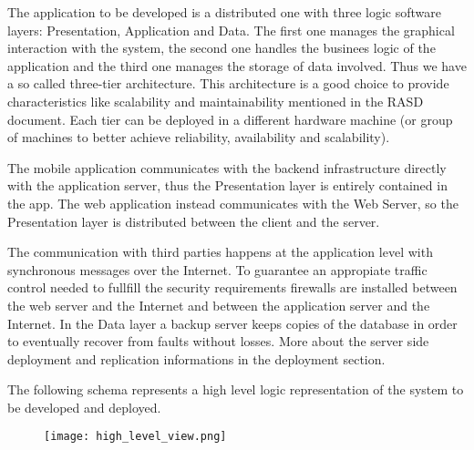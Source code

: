 The application to be developed is a distributed one with three logic software layers: Presentation, Application and Data. The first one manages the graphical interaction with the system, the second one handles the businees logic of the application and the third one manages the storage of data involved. Thus we have a so called three-tier architecture. This architecture is a good choice to provide characteristics like scalability and maintainability mentioned in the RASD document. Each tier can be deployed in a different hardware machine (or group of machines to better achieve reliability, availability and scalability).

The mobile application communicates with the backend infrastructure directly with the application server, thus the Presentation layer is entirely contained in the app. The web application instead communicates with the Web Server, so the Presentation layer is distributed between the client and the server. 

The communication with third parties happens at the application level with synchronous messages over the Internet. To guarantee an appropiate traffic control needed to fullfill the security requirements firewalls are installed between the web server and the Internet and between the application server and the Internet. In the Data layer a backup server keeps copies of the database in order to eventually recover from faults without losses. More about the server side deployment and replication informations in the deployment section.

The following schema represents a high level logic representation of the system to be developed and deployed.

\begin{figure}[H]
    \centering
    \texttt{[image: high\_level\_view.png]}
\end{figure}